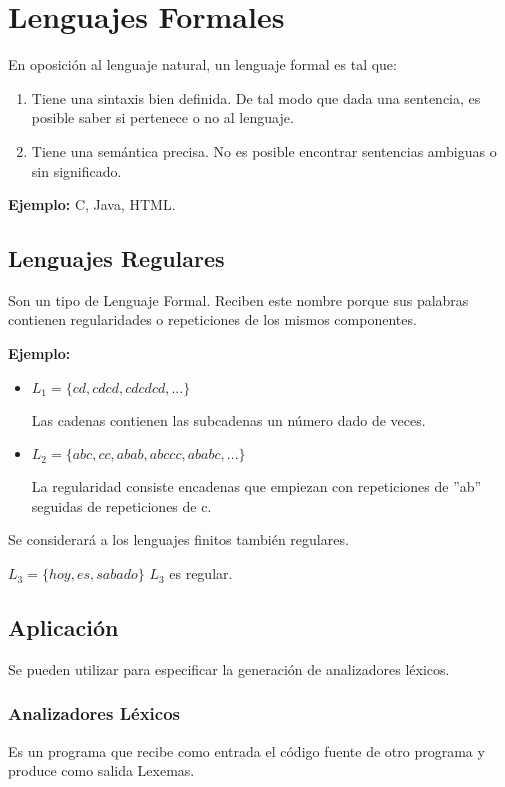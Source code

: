 \chapter{Lenguajes Formales}

En oposición al lenguaje natural, un lenguaje formal es tal que:
\begin{enumerate}
\item Tiene una sintaxis bien definida. De tal modo que dada una sentencia, es posible saber si pertenece o no al lenguaje.
\item Tiene una semántica precisa. No es posible encontrar sentencias ambiguas o sin significado.
\end{enumerate}
\textbf{Ejemplo: }C, Java, HTML.

\section{Lenguajes Regulares}

Son un tipo de Lenguaje Formal. Reciben este nombre porque sus palabras contienen regularidades o repeticiones de los mismos componentes.

\textbf{Ejemplo: }
\begin{itemize}
\item $L_1=\{cd,cdcd,cdcdcd,...\}$

Las cadenas contienen las subcadenas un número dado de veces.
\item $L_2=\{ abc,cc,abab,abccc,ababc,...\}$

La regularidad consiste encadenas que empiezan con repeticiones de ''ab'' seguidas de repeticiones de c.
\end{itemize}

Se considerará a los lenguajes finitos también regulares.

$L_3=\{ hoy, es, sabado \}$ $L_3$ es regular.

\section{Aplicación}

Se pueden utilizar para especificar la generación de analizadores léxicos.
\subsection{Analizadores Léxicos}

Es un programa que recibe como entrada el código fuente de otro programa y produce como salida Lexemas.


